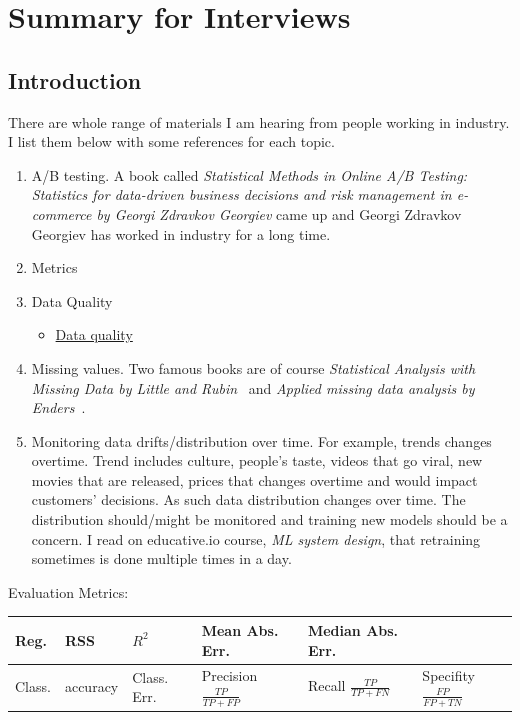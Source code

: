 \chapter{Summary for Interviews}
\label{chap:Summary_for_Interviews}

\section{Introduction}
\label{sec:Summary_for_Interviews_Introduction_Interview}
There are whole range of materials I am hearing from
people working in industry. I list them below with some
references for each topic.
\begin{enumerate}
\item A/B testing. A book called \emph{Statistical Methods in Online A/B Testing: Statistics for data-driven business decisions and risk management in e-commerce by Georgi Zdravkov Georgiev}
came up and Georgi Zdravkov Georgiev has worked in industry for a long time.

\item Metrics

\item Data Quality
\begin{itemize}
\item \href{https://www.alation.com/blog/data-quality-metrics/}{Data quality}
\end{itemize}

\item Missing values. Two famous books are of course
\emph{Statistical Analysis with Missing Data by Little and Rubin}~\citep{little2019statistical}
and
\emph{Applied missing data analysis by Enders}~\citep{enders2022applied}.


\item Monitoring data drifts/distribution over time. 
For example, trends changes overtime. 
Trend includes culture, people's taste, videos that go viral,
new movies that are released, prices that changes overtime and would
impact customers' decisions. 
As such data distribution changes over time.
The distribution should/might be monitored and training new
models should be a concern. I read on educative.io course, \emph{ML system design}, 
that retraining sometimes is done multiple times in a day.


\end{enumerate}



Evaluation Metrics:
\begin{table}[h!]
\begin{tabular}{|l|l|l|l|l|l|}
\hline
Reg.   & RSS    & $R^2$     & Mean Abs. Err. & Median Abs. Err. &           \\ \hline
Class. & accuracy & Class. Err. & Precision $\frac{TP}{TP+FP}$ & Recall   $\frac{TP}{TP+FN}$  & Specifity $\frac{FP}{FP+TN}$ \\ \hline
\end{tabular}
\end{table}

